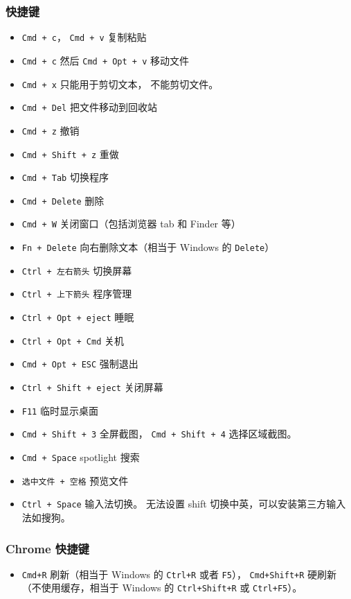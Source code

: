 \subsubsection{快捷键}
\begin{itemize}
\item \verb|Cmd + c|， \verb|Cmd + v| 复制粘贴
\item \verb|Cmd + c| 然后 \verb|Cmd + Opt + v| 移动文件
\item \verb|Cmd + x| 只能用于剪切文本， 不能剪切文件。
\item \verb|Cmd + Del| 把文件移动到回收站
\item \verb|Cmd + z| 撤销
\item \verb|Cmd + Shift + z| 重做
\item \verb|Cmd + Tab| 切换程序
\item \verb|Cmd + Delete| 删除
\item \verb`Cmd + W` 关闭窗口（包括浏览器 tab 和 Finder 等）
\item \verb|Fn + Delete| 向右删除文本（相当于 Windows 的 \verb|Delete|）
\item \verb|Ctrl + 左右箭头| 切换屏幕
\item \verb|Ctrl + 上下箭头| 程序管理
\item \verb|Ctrl + Opt + eject| 睡眠
\item \verb|Ctrl + Opt + Cmd| 关机
\item \verb|Cmd + Opt + ESC| 强制退出
\item \verb|Ctrl + Shift + eject| 关闭屏幕
\item \verb|F11| 临时显示桌面
\item \verb|Cmd + Shift + 3| 全屏截图， \verb|Cmd + Shift + 4| 选择区域截图。
\item \verb|Cmd + Space| spotlight 搜索
\item \verb|选中文件 + 空格| 预览文件
\item \verb|Ctrl + Space| 输入法切换。 无法设置 shift 切换中英，可以安装第三方输入法如搜狗。
\end{itemize}

\subsubsection{Chrome 快捷键}
\begin{itemize}
\item \verb|Cmd+R| 刷新（相当于 Windows 的 \verb|Ctrl+R| 或者 \verb|F5|）， \verb|Cmd+Shift+R| 硬刷新（不使用缓存，相当于 Windows 的 \verb|Ctrl+Shift+R| 或 \verb|Ctrl+F5|）。
\end{itemize}


